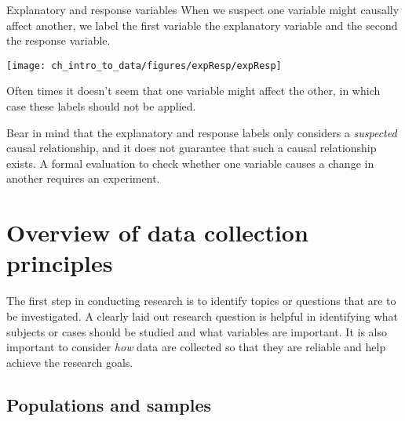 
\begin{onebox}{Explanatory and response variables}
When we suspect one variable might causally affect another,
we label the first variable the explanatory variable and the
second the response variable.
\vspace{1mm}

\hspace{10mm}\texttt{[image: ch\_intro\_to\_data/figures/expResp/expResp]}

Often times it doesn't seem that one variable might
affect the other,
in which case these labels should not be applied.
\end{onebox}

Bear in mind that
the explanatory and response labels only considers
a \emph{suspected} causal relationship, and it does not guarantee
that such a causal relationship exists.
A formal evaluation to check whether one variable causes
a change in another requires an experiment.




\section{Overview of data collection principles}
\label{overviewOfDataCollectionPrinciples}


The first step in conducting research is to identify topics
or questions that are to be investigated.
A clearly laid out research question is helpful in identifying
what subjects or cases should be studied and what variables are
important.
It is also important to consider \emph{how} data are collected
so that they are reliable and help achieve the research goals.



\subsection{Populations and samples}
\label{populationsAndSamples}


